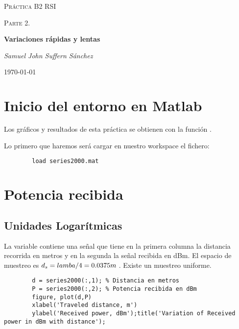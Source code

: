 \documentclass{article}
\begin{document}
\begin{titlepage}
\centering
{\scshape\LARGE Práctica B2 RSI\par}
	\vspace{1cm}
	{\scshape\Large Parte 2. \par}
	\vspace{1.5cm}
	{\huge\bfseries Variaciones rápidas y lentas\par}
	\vspace{2cm}
	{\Large\itshape Samuel John Suffern Sánchez\par}

	\vfill
	\vfill
	{\large \today\par}
\end{titlepage}


\tableofcontents
\listoffigures
\pagebreak




\section{Inicio del entorno en Matlab}
    \par Los gráficos y resultados de esta práctica se obtienen con la función . 
    \par Lo primero que haremos será cargar en nuestro workspace el fichero: 
    \begin{lstlisting}
        load series2000.mat
    \end{lstlisting}
\section{Potencia recibida}
    \subsection{Unidades Logarítmicas}
    \par La variable  contiene una señal que tiene en la primera columna la distancia recorrida en metros y en la segunda la señal recibida en dBm. El espacio de muestreo es \(d_{s} = lamba/4 = 0.0375m \hspace{0.1cm} \). Existe un muestreo uniforme.
    \begin{lstlisting}
        d = series2000(:,1); % Distancia en metros
        P = series2000(:,2); % Potencia recibida en dBm
        figure, plot(d,P)
        xlabel('Traveled distance, m')
        ylabel('Received power, dBm');title('Variation of Received power in dBm with distance');
    \end{lstlisting} 
\end{document}
